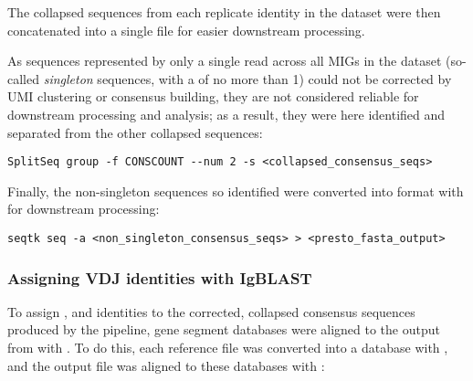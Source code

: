 The collapsed sequences from each replicate identity in the dataset were then concatenated into a single file for easier downstream processing. 

As sequences represented by only a single read across all MIGs in the dataset (so-called \textit{singleton} sequences, with a  of no more than 1) could not be corrected by UMI clustering or consensus building, they are not considered reliable for downstream processing and analysis; as a result, they were here identified and separated from the other collapsed sequences:

\begin{lstlisting}
SplitSeq group -f CONSCOUNT --num 2 -s <collapsed_consensus_seqs>
\end{lstlisting}

Finally, the non-singleton sequences so identified were converted into  format with  \parencite{li2016seqtk} for downstream processing:

\begin{lstlisting}
seqtk seq -a <non_singleton_consensus_seqs> > <presto_fasta_output>
\end{lstlisting}

\subsubsection{Assigning VDJ identities with IgBLAST}
\label{sec:methods_comp_igpreproc_igblast}


To assign \vh, \dh and \jh identities to the corrected, collapsed consensus sequences produced by the  pipeline, gene segment databases were aligned to the  output from  with  \parencite{ye2013igblast}. To do this, each reference file was converted into a  database with , and the output  file was aligned to these databases with :

